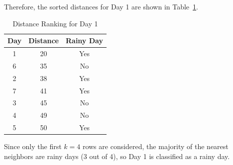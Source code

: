 \documentclass[12pt]{article}
\begin{document}
\begin{ejercicio}
\begin{itemize}
            Therefore, the sorted distances for Day 1 are shown in Table~\ref{tab:day1_distances}.
            \begin{table}[h!]
            \centering
            \begin{tabular}{|c|c|c|}
            \hline
            \textbf{Day} & \textbf{Distance} & \textbf{Rainy Day} \\ \hline
            1 & 20 & Yes \\ 
            6 & 35 & No \\ 
            2 & 38 & Yes \\ 
            7 & 41 & Yes \\ \hline
            3 & 45 & No \\ 
            4 & 49 & No \\ 
            5 & 50 & Yes \\ \hline
            \end{tabular}
            \caption{Distance Ranking for Day 1}
            \label{tab:day1_distances}
            \end{table}
            Since only the first $k=4$ rows are considered, the majority of the nearest neighbors are rainy days (3 out of 4), so Day 1 is classified as a rainy day.


\end{itemize}
\end{ejercicio}
\end{document}
